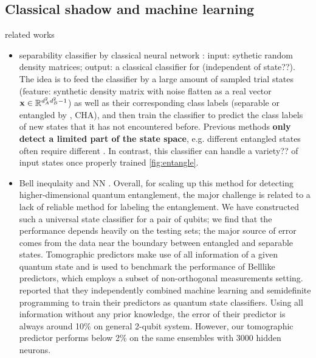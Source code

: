 \documentclass[
10pt,
aps,
pra,
linenumbers,
floatfix,
]{revtex4-2}
\theoremstyle{plain}
\theoremstyle{definition}
\begin{document}
\subsection{Classical shadow and machine learning}
related works
\begin{itemize}
	\item separability classifier by classical neural network \cite{luSeparabilityEntanglementClassifierMachine2018}:
	input: sythetic random density matrices;
	output: a classical classifier for  (independent of state??).
	The idea is to feed the classifier by a large amount of sampled trial states (feature: synthetic density matrix with noise flatten as a real vector $\vb{x}\in\mathbb{R}^{d_A^2d_B^2-1}$) as well as their corresponding class labels (separable or entangled by , CHA), and then train the classifier to predict the class labels of new states that it has not encountered before.
	Previous methods \textbf{only detect a limited part of the state space}, e.g. different entangled states often require different . In contrast, this classifier can handle a variety?? of input states once properly trained \cref{fig:entangle}.

	\item Bell inequlaity and NN \cite{maTransformingBellInequalities2018}. 
	Overall, for scaling up this method for detecting higher-dimensional quantum entanglement, the major challenge is related to a lack of reliable method for labeling the entanglement.
	We have constructed such a universal state classiﬁer for a pair of qubits; we ﬁnd that the performance depends heavily on the testing sets; the major source of error comes from the data near the boundary between entangled and separable states.
	Tomographic predictors make use of all information of a given quantum state and is used to benchmark the performance of Belllike predictors, which employs a subset of non-orthogonal measurements setting.
	\cite{luSeparabilityEntanglementClassifierMachine2018} reported that they independently combined machine learning and semideﬁnite programming to train their predictors as quantum state classiﬁers. Using all information without any prior knowledge, the error of their predictor is always around 10\% on general 2-qubit system. However, our tomographic predictor performs below 2\% on the same ensembles with 3000 hidden neurons.


\end{itemize}
\end{document}
